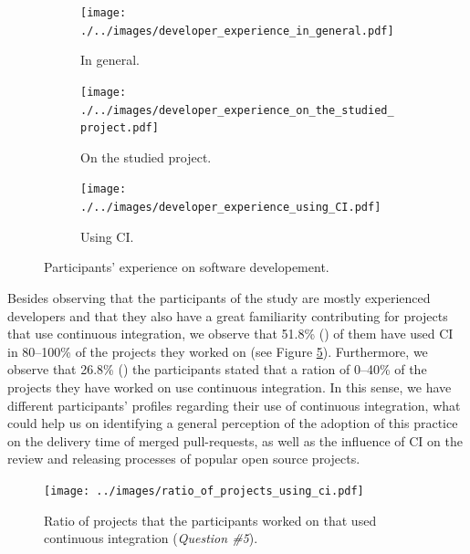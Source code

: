 	\begin{figure}[H]
	\begin{subfigure}[b]{0.3\textwidth}
		\centering
		\texttt{[image: ./../images/developer\_experience\_in\_general.pdf]}
		\caption{In general.}
		\label{fig:developers_experience_in_general}
	\end{subfigure} %
	\begin{subfigure}[b]{0.3\textwidth}
		\centering
		\texttt{[image: ./../images/developer\_experience\_on\_the\_studied\_project.pdf]}
		\caption{On the studied project.}
		\label{fig:developers_experience_on_the_studied_project}
	\end{subfigure}
		\begin{subfigure}[b]{0.3\textwidth}
		\centering
		\texttt{[image: ./../images/developer\_experience\_using\_CI.pdf]}  
		\caption{Using CI.}
		\label{fig:developers_experience_using_ci}
	\end{subfigure}
		\caption{Participants' experience on software developement.}
		\label{fig:developers_experience}
	\end{figure}

	Besides observing that the participants of the study are mostly experienced developers and that they also have a great familiarity contributing for projects that use continuous integration, we observe that 51.8\% () of them have used CI in 80--100\% of the projects they worked on (see Figure \ref{fig:ratio_of_projects_using_ci}). Furthermore, we observe that  26.8\% () the participants stated that a ration of 0--40\%  of the projects they have worked on use continuous integration. In this sense, we have different participants' profiles regarding their use of continuous integration, what could help us on identifying a general perception of the adoption of this practice on the delivery time of merged pull-requests, as well as the influence of CI on the review and releasing processes of popular open source projects.

	\begin{figure}[H]

	\texttt{[image: ../images/ratio\_of\_projects\_using\_ci.pdf]}
	\caption{Ratio of projects that the participants worked on that used continuous integration (\textit{Question \#5}).}
	\label{fig:ratio_of_projects_using_ci}       %
	\end{figure}

